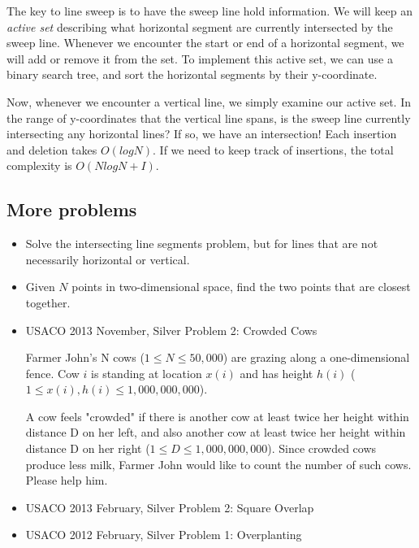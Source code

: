\documentclass{article}
\begin{document}
The key to line sweep is to have the sweep line hold information. We will keep an \textit{active set} describing what horizontal segment are currently intersected by the sweep line. Whenever we encounter the start or end of a horizontal segment, we will add or remove it from the set. To implement this active set, we can use a binary search tree, and sort the horizontal segments by their y-coordinate.

Now, whenever we encounter a vertical line, we simply examine our active set. In the range of y-coordinates that the vertical line spans, is the sweep line currently intersecting any horizontal lines? If so, we have an intersection! Each insertion and deletion takes $O(log N)$. If we need to keep track of insertions, the total complexity is $O(N log N + I)$.

\subsection{More problems}

\begin{itemize}
    \item Solve the intersecting line segments problem, but for lines that are not necessarily horizontal or vertical.
    \item Given $N$ points in two-dimensional space, find the two points that are closest together.

    \item USACO 2013 November, Silver Problem 2: Crowded Cows
    
    Farmer John's N cows ($1 \leq N \leq 50,000$) are grazing along a one-dimensional fence.  Cow $i$ is standing at location $x(i)$ and has height $h(i)$ ($1 \leq x(i), h(i) \leq 1,000,000,000$).  

    A cow feels "crowded" if there is another cow at least twice her height within distance D on her left, and also another cow at least twice her height within distance D on her right ($1 \leq D \leq 1,000,000,000$).  Since crowded cows produce less milk, Farmer John would like to count the number of such cows.  Please help him.
    
    \item USACO 2013 February, Silver Problem 2: Square Overlap
    \item USACO 2012 February, Silver Problem 1: Overplanting
\end{itemize}
\end{document}
